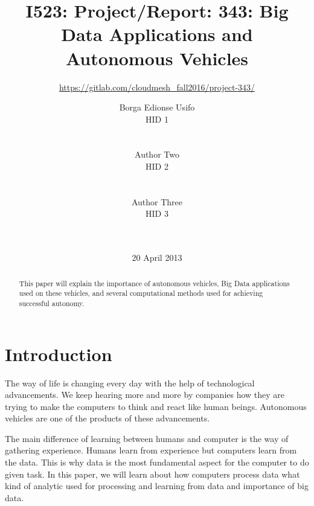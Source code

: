 \documentclass{acmart}
\begin{document}
\title{I523: Project/Report: 343: Big Data Applications and Autonomous Vehicles}

\subtitle{\url{https://gitlab.com/cloudmesh_fall2016/project-343/}}

\author{
\alignauthor
Borga Edionse Usifo\\
HID 1\\
       \\
       \\
\alignauthor
Author Two\\
HID 2\\
       \\
       \\
\alignauthor
Author Three\\ 
HID 3\\
       \\
       \\
}

\date{20 April 2013}


\maketitle
\begin{abstract}
This paper will explain the importance of autonomous vehicles, Big Data applications used on these vehicles, and several computational methods used for achieving successful autonomy. 
\end{abstract}

\section{Introduction}
The way of life is changing every day with the help of technological advancements. We keep hearing more and more by companies how they are trying to make the computers to think and react like human beings. Autonomous vehicles are one of the products of these advancements. 
\par The main difference of learning between humans and computer is the way of gathering experience. Humans learn from experience but computers learn from the data. This is why data is the most fundamental aspect for the computer to do given task. In this paper, we will learn about how computers process data what kind of analytic used for processing and learning from data and importance of big data.    
\end{document}
